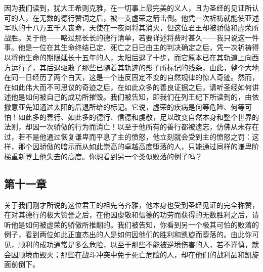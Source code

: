 因为我们读到，犹大王希则克雅，在一切事上最完美的义人，且为圣经的见证所认可的人，在无数的德行赞词之后，被一支虚荣之箭击倒。他凭一次祈祷就能使亚述军队的十八万五千人丧命，天使在一夜间将其消灭，但这位君王却被骄傲和虚荣所战胜。关于他——略过那长长的德行清单，若要详述将费时甚久——我只说这一件事。他是一位在其生命终结已定、死亡之日已由主的判决确定之后，凭一次祈祷得以将他生命的期限延长十五年的人，太阳后退了十步，而它原本已在其轨道上向西方运行了，其后退驱散了那些已随着其轨迹的影子所标记的线条，由此，整个大地在同一日经历了两个白天，这是一个违反固定不变的自然规律的惊人奇迹。然而，在如此伟大而不可思议的奇迹之后，在如此众多的善良证据之后，请听圣经如何讲述他是如何被自己的成功所摧毁。我们被告知，即我们在列王纪下所读到的，由依撒意亚先知通过太阳的后退所给的标记。它说，虚荣的疾病是何等危险、何等可怕！如此多的善行、如此多的德行、信德和虔敬，足以改变自然本身和整个世界的法则，却因一次骄傲的行为而消亡！以至于他所有的善行都被遗忘，仿佛从未存在过，若不是他通过恢复谦卑而平息了主的愤怒，他立刻就会受到主的愤怒之罚：这样，那个因骄傲的暗示而从如此崇高的卓越高度堕落的人，只能通过同样的谦卑阶梯重新登上他失去的高度。你想看到另一个类似败落的例子吗？\par


\subsection{第十一章}

\par

关于我们刚才所说的这位君王的祖先乌齐雅，他本身也受到圣经见证的完全称赞，在对其德行的极大赞誉之后，在他因虔敬和信德的功劳而获得的无数胜利之后，请听他是如何被虚荣的骄傲所推翻的。我们被告知，你看到另一个极其可怕的败落的例子，看到两位如此正直杰出的人是如何因他们的胜利和凯旋而堕落的。由此你可见，顺利的成功通常是多么危险，以至于那些不能被逆境伤害的人，若不谨慎，就会因顺境而毁灭；那些在战斗冲突中免于死亡危险的人，却在他们的战利品和凯旋面前倒下。\par

